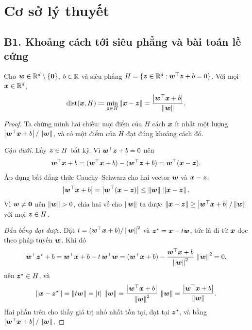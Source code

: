 \section{Cơ sở lý thuyết}\label{sec:theory}

\subsection{B1. Khoảng cách tới siêu phẳng và bài toán lề cứng}\label{sec:B1}

\begin{proposition}\label{prop:B1-distance}
Cho $\vw \in \R^d \setminus \{\vzero\}$, $b \in \R$ và siêu phẳng
$H = \{\vz \in \R^d : \vw\T\vz + b = 0\}$. Với mọi $\vx \in \R^d$,
\[
  \operatorname{dist}(\vx, H) \coloneqq \min_{\vz \in H} \norm{\vx - \vz}
  = \frac{\abs{\vw\T\vx + b}}{\norm{\vw}}.
\]
\end{proposition}

\begin{proof}
Ta chứng minh hai chiều: mọi điểm của $H$ cách $\vx$ ít nhất một lượng
$\abs{\vw\T\vx + b}/\norm{\vw}$, và có một điểm của $H$ đạt đúng khoảng cách đó.

\emph{Cận dưới.} Lấy $\vz \in H$ bất kỳ. Vì $\vw\T\vz + b = 0$ nên
\[
  \vw\T\vx + b = (\vw\T\vx + b) - (\vw\T\vz + b) = \vw\T(\vx - \vz).
\]
Áp dụng bất đẳng thức Cauchy--Schwarz cho hai vector $\vw$ và $\vx - \vz$:
\[
  \abs{\vw\T\vx + b} = \abs{\vw\T(\vx - \vz)} \le \norm{\vw}\,\norm{\vx - \vz}.
\]
Vì $\vw \ne \vzero$ nên $\norm{\vw} > 0$, chia hai vế cho $\norm{\vw}$ ta được
$\norm{\vx - \vz} \ge \abs{\vw\T\vx + b}/\norm{\vw}$ với mọi $\vz \in H$.

\emph{Dấu bằng đạt được.} Đặt $t = (\vw\T\vx + b)/\norm{\vw}^2$ và $\vz^\star = \vx - t\vw$,
tức là đi từ $\vx$ dọc theo pháp tuyến $\vw$. Khi đó
\[
  \vw\T\vz^\star + b = \vw\T\vx + b - t\,\vw\T\vw
  = (\vw\T\vx + b) - \frac{\vw\T\vx + b}{\norm{\vw}^2}\,\norm{\vw}^2 = 0,
\]
nên $\vz^\star \in H$, và
\[
  \norm{\vx - \vz^\star} = \norm{t\vw} = \abs{t}\,\norm{\vw}
  = \frac{\abs{\vw\T\vx + b}}{\norm{\vw}^2}\,\norm{\vw} = \frac{\abs{\vw\T\vx + b}}{\norm{\vw}}.
\]
Hai phần trên cho thấy giá trị nhỏ nhất tồn tại, đạt tại $\vz^\star$, và bằng
$\abs{\vw\T\vx + b}/\norm{\vw}$.
\end{proof}

